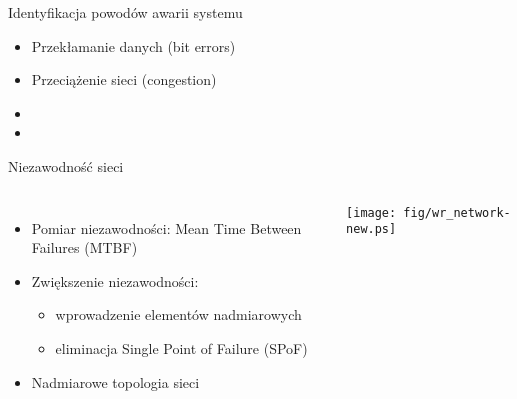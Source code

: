 \documentclass[compress,red]{beamer}
\begin{document}
\begin{frame}{Identyfikacja powodów awarii systemu}


  \begin{itemize}
    \item Przekłamanie danych (bit errors)
    \item Przeciążenie sieci (congestion)
    \item {}
    \item \color{black}{Zbyt długi czas transmisji (exceeding upper bound latency)}
  \end{itemize}

\end{frame}
\begin{frame}{Niezawodność sieci}


  \begin{columns}[c]

  \begin{itemize}
    \item Pomiar niezawodności: Mean Time Between Failures (MTBF)
    \item Zwiększenie niezawodności:
    \begin{itemize}
      \item wprowadzenie elementów nadmiarowych
      \item eliminacja Single Point of Failure (SPoF)
    \end{itemize}
    \item Nadmiarowe topologia sieci
  \end{itemize}

      \vspace{2cm}


      \begin{center}
      \texttt{[image: fig/wr\_network-new.ps]}
      \end{center}

      \vspace{2cm}

  \end{columns}

\end{frame}
\end{document}
